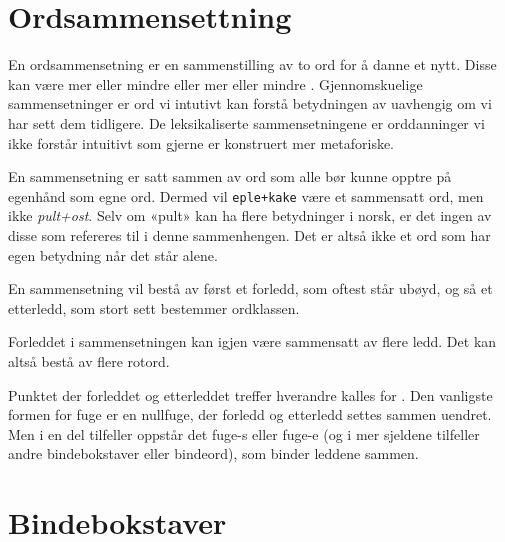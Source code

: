 \newline
{}\newline

\section{Ordsammensettning}

En ordsammensetning er en sammenstilling av to ord for å danne et nytt. Disse kan være mer eller mindre  eller mer eller mindre . Gjennomskuelige sammensetninger er ord vi intutivt kan forstå betydningen av uavhengig om vi har sett dem tidligere. De leksikaliserte sammensetningene er orddanninger vi ikke forstår intuitivt som gjerne er konstruert mer metaforiske.

\newline
{}

En sammensetning er satt sammen av ord som alle bør kunne opptre på egenhånd som egne ord. Dermed vil \texttt{eple+kake} være et sammensatt ord, men ikke \textit{pult+ost}. Selv om «pult» kan ha flere betydninger i norsk, er det ingen av disse som refereres til i denne sammenhengen. Det er altså ikke et ord som har egen betydning når det står alene. 

En sammensetning vil bestå av først et forledd, som oftest står ubøyd, og så et etterledd, som stort sett bestemmer ordklassen.


Forleddet i sammensetningen kan igjen være sammensatt av flere ledd. Det kan altså bestå av flere rotord.


Punktet der forleddet og etterleddet treffer hverandre kalles for . Den vanligste formen for fuge er en nullfuge, der forledd og etterledd settes sammen uendret. Men i en del tilfeller oppstår det fuge-s eller fuge-e (og i mer sjeldene tilfeller andre bindebokstaver eller bindeord), som binder leddene sammen. 

\section{Bindebokstaver}
\label{sec:fuge-bokstav}

